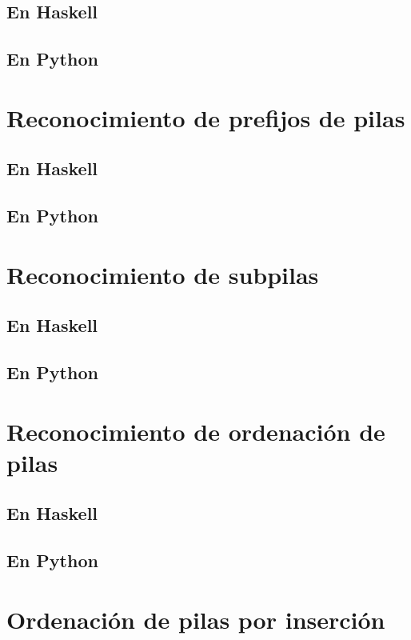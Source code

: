 \documentclass[a4paper,12pt,twoside]{book}
\begin{document}
\subsection{En Haskell}
\subsection{En Python}

\section{Reconocimiento de prefijos de pilas}
\subsection{En Haskell}
\subsection{En Python}

\section{Reconocimiento de subpilas}
\subsection{En Haskell}
\subsection{En Python}

\section{Reconocimiento de ordenación de pilas}
\subsection{En Haskell}
\subsection{En Python}

\section{Ordenación de pilas por inserción}
\end{document}
